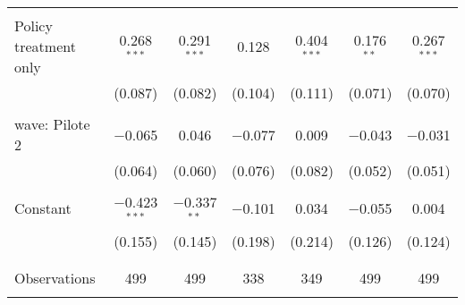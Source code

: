\begin{tabular}{@{\extracolsep{5pt}}lcccccc}
  & & & & & & \\ 
 Policy treatment only & 0.268$^{***}$ & 0.291$^{***}$ & 0.128 & 0.404$^{***}$ & 0.176$^{**}$ & 0.267$^{***}$ \\ 
  & (0.087) & (0.082) & (0.104) & (0.111) & (0.071) & (0.070) \\ 
  & & & & & & \\ 
 wave: Pilote 2 & $-$0.065 & 0.046 & $-$0.077 & 0.009 & $-$0.043 & $-$0.031 \\ 
  & (0.064) & (0.060) & (0.076) & (0.082) & (0.052) & (0.051) \\ 
  & & & & & & \\ 
 Constant & $-$0.423$^{***}$ & $-$0.337$^{**}$ & $-$0.101 & 0.034 & $-$0.055 & 0.004 \\ 
  & (0.155) & (0.145) & (0.198) & (0.214) & (0.126) & (0.124) \\ 
  & & & & & & \\ 
\hline \\[-1.8ex] 

Observations & 499 & 499 & 338 & 349 & 499 & 499 \\ 
\hline 
\hline \\[-1.8ex] 
\end{tabular} 